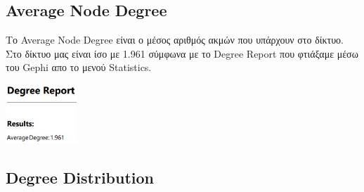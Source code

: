 \documentclass[12pt]{article}
\begin{document}
	\subsection{Average Node Degree}
	Το Average Node Degree είναι ο μέσος αριθμός ακμών που υπάρχουν στο δίκτυο. Στο δίκτυο μας είναι ίσο με 1.961 σύμφωνα με το Degree Report που φτιάξαμε μέσω του Gephi απο το μενού Statistics.
	\begin{center}
		\includegraphics[width=0.2\textwidth]{photos-files/section6/average_degree.JPG}
	\end{center}
	
	\newpage
	\subsection{Degree Distribution} %
		
\end{document}
